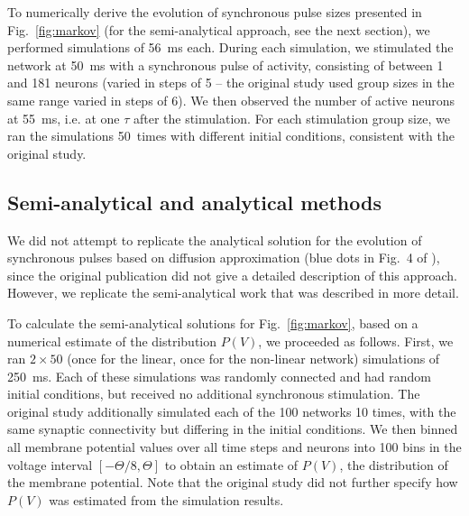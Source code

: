 \documentclass[10pt,a4paper,onecolumn]{article}
\begin{document}
To numerically derive the evolution of synchronous pulse sizes presented in Fig.~\ref{fig:markov} (for the semi-analytical approach, see the next section), we performed simulations of \SI{56}{\milli\second} each. During each simulation, we stimulated the network at \SI{50}{\milli\second} with a synchronous pulse of activity, consisting of between 1 and 181 neurons (varied in steps of 5 -- the original study used group sizes in the same range varied in steps of 6). We then observed the number of active neurons at \SI{55}{\milli\second}, i.e. at one $\tau$ after the stimulation. For each stimulation group size, we ran the simulations 50~times with different initial conditions, consistent with the original study.

\subsection*{Semi-analytical and analytical methods}
We did not attempt to replicate the analytical solution for the evolution of synchronous pulses based on diffusion approximation (blue dots in Fig.~4 of \cite{Memmesheimer2012}), since the original publication did not give a detailed description of this approach. However, we replicate the semi-analytical work that was described in more detail.

To calculate the semi-analytical solutions for Fig.~\ref{fig:markov}, based on a numerical estimate of the distribution $P(V)$, we proceeded as follows. First, we ran $2\times 50$ (once for the linear, once for the non-linear network) simulations of \SI{250}{\milli\second}. Each of these simulations was randomly connected and had random initial conditions, but received no additional synchronous stimulation. The original study additionally simulated each of the 100 networks 10 times, with the same synaptic connectivity but differing in the initial conditions. We then binned all membrane potential values over all time steps and neurons into 100 bins in the voltage interval $[-\Theta/8, \Theta]$ to obtain an estimate of $P(V)$, the distribution of the membrane potential. Note that the original study did not further specify how $P(V)$ was estimated from the simulation results.
\end{document}
